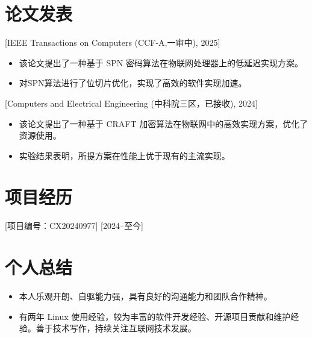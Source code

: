 \documentclass{resume}
\begin{document}
\section{论文发表}

[IEEE Transactions on Computers (CCF-A,一审中), 2025]
\begin{itemize}
  \item 该论文提出了一种基于 SPN 密码算法在物联网处理器上的低延迟实现方案。
  \item 对SPN算法进行了位切片优化，实现了高效的软件实现加速。
\end{itemize}

[Computers and Electrical Engineering (中科院三区，已接收), 2024]
\begin{itemize}
  \item 该论文提出了一种基于 CRAFT 加密算法在物联网中的高效实现方案，优化了资源使用。
  \item 实验结果表明，所提方案在性能上优于现有的主流实现。
\end{itemize}

\section{项目经历}
[项目编号：CX20240977]
[2024--至今]

\section{个人总结}

\begin{itemize}
  \item 本人乐观开朗、自驱能力强，具有良好的沟通能力和团队合作精神。
  \item 有两年 Linux 使用经验，较为丰富的软件开发经验、开源项目贡献和维护经验。善于技术写作，持续关注互联网技术发展。
\end{itemize}
\end{document}
